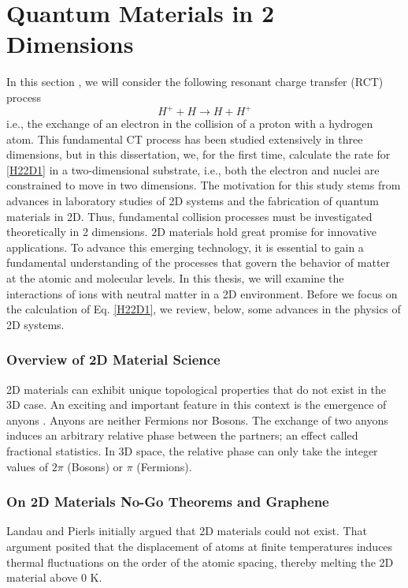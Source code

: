 \chapter{Quantum Materials in 2 Dimensions}
\label{chap:2DS}
In this section , we will consider the following resonant charge transfer (RCT) process 
\begin{equation}\label{H22D1}
H^{+} + H \rightarrow H + H^{+}
\end{equation}
i.e., the exchange of an electron in the collision of a proton
with a hydrogen atom. This fundamental CT process has been
studied extensively in three dimensions, but in this dissertation, we, for the first time, calculate the rate for
\eqref{H22D1} in a two-dimensional substrate, i.e., both the electron
and nuclei are constrained to move in two dimensions.
The motivation for this study stems from advances in laboratory
studies of 2D systems and the fabrication of quantum materials in 2D. Thus, fundamental collision processes must be investigated theoretically in 2 dimensions. 
2D materials hold great promise for innovative applications. To advance this emerging technology, it is essential to gain a fundamental understanding of the processes that govern the behavior of matter at the atomic and molecular levels. In this thesis, we will examine the interactions of ions with neutral matter in a 2D environment. 
Before we focus on the calculation of Eq. \eqref{H22D1}, we review, below, some advances in the physics of 2D systems.
\subsection{Overview of 2D Material Science}
2D materials can exhibit unique topological properties that do not exist in the 3D case. An exciting and important feature in this context is the emergence of anyons \cite{anyonsR}. Anyons are neither Fermions nor Bosons. The exchange of two anyons induces an arbitrary relative phase between the partners; an effect called fractional statistics.
In 3D space, the relative phase can only take the integer values of $2 \pi $ (Bosons) or $ \pi$ (Fermions).
 \subsection{On 2D Materials No-Go Theorems and Graphene}
Landau and Pierls\cite{LandauG}\cite{Pierls} initially argued that 2D materials could not exist. That argument posited that the displacement of atoms at finite temperatures induces thermal fluctuations on the order of the atomic spacing, thereby melting the 2D material above 0 K. 

